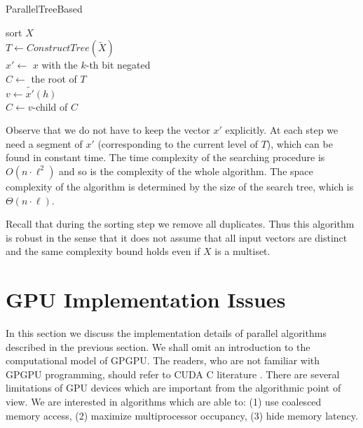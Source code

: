\documentclass[a4paper]{article}
\begin{document}
\begin{algorithm}[htb]
\small
\caption {ParallelTreeBased}
\label{alg:par-treebased}
sort $X$\\
$T \gets ConstructTree(\widetilde X)$\\
{
	{
	$x' \gets$ $x$ with the $k$-th bit negated\\
	$C \gets$ the root of $T$\\
	{
		$v \gets \widetilde{x'}(h)$\\
		 {\Stop}
		$C \gets v$-child of $C$\\
	}
	}
}
\end{algorithm}

Observe that we do not have to keep the vector $x'$ explicitly. At each step we need a segment of $x'$ (corresponding to the current level of $T$), which can be found in constant time.
The time complexity of the searching procedure is $O(n \cdot \ell^2)$ and so is the complexity of the whole algorithm. The space complexity of the algorithm is determined by the size of the search tree, which is $\Theta(n \cdot \ell)$.

Recall that during the sorting step we remove all duplicates. Thus this algorithm is robust in the sense that it does not assume that all input vectors are distinct and the same complexity bound holds even if $X$ is a multiset. 

\section{GPU Implementation Issues} \label{sec:implissues}

In this section we discuss the implementation details of parallel algorithms described in the previous section. We shall omit an introduction to the computational model of GPGPU. The readers, who are not familiar with GPGPU programming, should refer to CUDA C literature \cite{cuda-best-practices,kirk2012programming}.
There are several limitations of GPU devices which are important from the algorithmic point of view. We are interested in algorithms which are able to:
(1) use coalesced memory access,
(2) maximize multiprocessor occupancy,
(3) hide memory latency.
\end{document}
